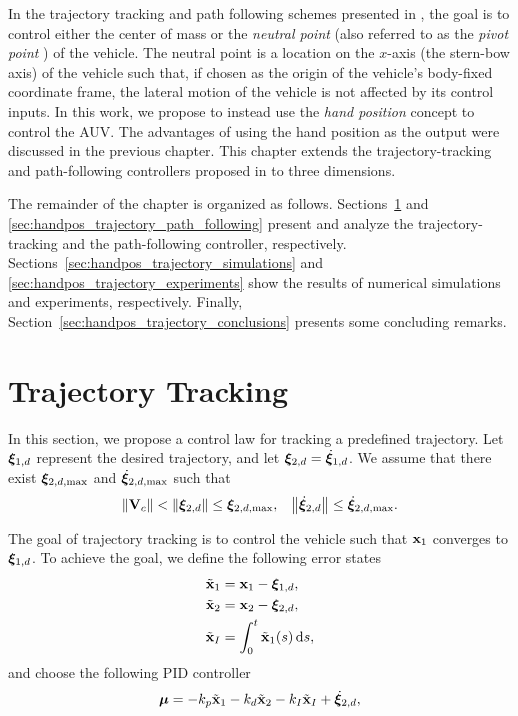 In the trajectory tracking and path following schemes presented in \citeexistingmethods, the goal is to control either the center of mass or the \emph{neutral point} (also referred to as the \emph{pivot point} \cite{paliotta_trajectory_2019}) of the vehicle.
The neutral point is a location on the $x$-axis (the stern-bow axis) of the vehicle such that, if chosen as the origin of the vehicle's body-fixed coordinate frame, the lateral motion of the vehicle is not affected by its control inputs.
In this work, we propose to instead use the \emph{hand position} concept to control the AUV.
The advantages of using the hand position as the output were discussed in the previous chapter.
This chapter extends the trajectory-tracking and path-following controllers proposed in \cite{paliotta_trajectory_2019} to three dimensions.

The remainder of the chapter is organized as follows.
Sections~\ref{sec:handpos_trajectory_trajectory_tracking} and \ref{sec:handpos_trajectory_path_following} present and analyze the trajectory-tracking and the path-following controller, respectively.
Sections~\ref{sec:handpos_trajectory_simulations} and \ref{sec:handpos_trajectory_experiments} show the results of numerical simulations and experiments, respectively.
Finally, Section~\ref{sec:handpos_trajectory_conclusions} presents some concluding remarks.

\section{Trajectory Tracking}
\label{sec:handpos_trajectory_trajectory_tracking}
In this section, we propose a control law for tracking a predefined trajectory.
Let $\bm{\xi}_{1, d}$ represent the desired trajectory, and let $\bm{\xi}_{2, d} = \dot{\bm{\xi}}_{1, d}$.
We assume that there exist $\bm{\xi}_{2, d, \max}$ and $\dot{\bm{\xi}}_{2, d, \max}$ such that
\begin{align}
    \left\|\mathbf{V}_c\right\| &< \left\|\bm{\xi}_{2, d}\right\| \leq \bm{\xi}_{2, d, \max}, &
    \left\|\dot{\bm{\xi}}_{2, d}\right\| \leq \dot{\bm{\xi}}_{2, d, \max}.
\end{align}

The goal of trajectory tracking is to control the vehicle such that $\mathbf{x}_1$ converges to $\bm{\xi}_{1, d}$.
To achieve the goal, we define the following error states
\begin{subequations}
    \begin{align}
        \tilde{\mathbf{x}}_1 &= \mathbf{x}_1 - \bm{\xi}_{1, d}, \\
        \tilde{\mathbf{x}}_2 &= \mathbf{x}_2 - \bm{\xi}_{2, d}, \\
        \tilde{\mathbf{x}}_I &= \int_{0}^t \tilde{\mathbf{x}}_1(s)\, {\rm d}s,
    \end{align} \label{eq:handpos_trajectory_error_states}
\end{subequations}
and choose the following PID controller
\begin{equation}
    \bm{\mu} = -k_p \tilde{\mathbf{x}}_1 - k_d \tilde{\mathbf{x}}_2 - k_I \tilde{\mathbf{x}}_I + \dot{\bm{\xi}}_{2, d}, \label{eq:handpos_trajectory_external_controller}
\end{equation}


